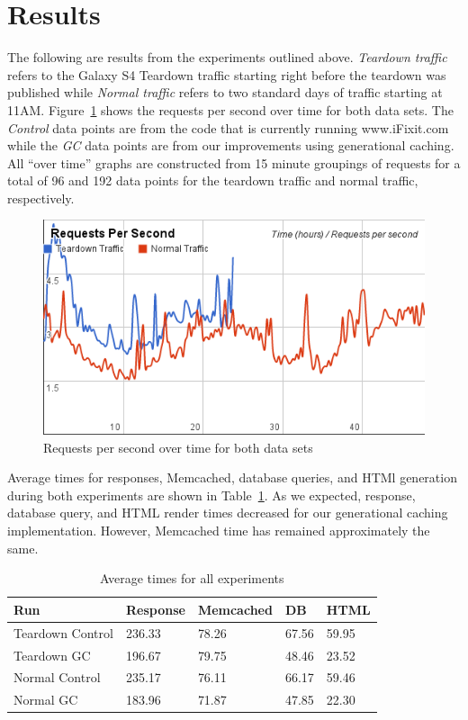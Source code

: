 \documentclass[12pt]{ucthesis}
\begin{document}
\section{Results} \label{results}
The following are results from the experiments outlined above.
\textit{Teardown traffic} refers to the Galaxy S4 Teardown traffic starting right before the teardown was published while \textit{Normal traffic} refers to two standard days of traffic starting at 11AM\@.
Figure~\ref{fig:requestsPerSecXTime} shows the requests per second over time for both data sets.
The \textit{Control} data points are from the code that is currently running \textsf{www.iFixit.com} while the \textit{GC} data points are from our improvements using generational caching.
All ``over time'' graphs are constructed from 15 minute groupings of requests for a total of 96 and 192 data points for the teardown traffic and normal traffic, respectively.

\begin{figure}[h]
\centering
\includegraphics[width=\textwidth]{assets/requestsPerSecXTime.png}
\caption{Requests per second over time for both data sets}
\label{fig:requestsPerSecXTime}
\end{figure}

Average times for responses, \textsf{Memcached}, database queries, and HTMl generation during both experiments are shown in Table~\ref{tab:averageExperimentTimes}.
As we expected, response, database query, and HTML render times decreased for our generational caching implementation.
However, \textsf{Memcached} time has remained approximately the same.

\begin{table}[h]
\begin{center}
\begin{tabular}{| l | l | l | l | l |}
   \hline
   Run & Response & Memcached & DB & HTML \\ \hline
   Teardown Control & 236.33 & 78.26 & 67.56 & 59.95 \\ \hline
   Teardown GC & 196.67 & 79.75 & 48.46 & 23.52 \\ \hline
   \hline
   Normal Control & 235.17 & 76.11 & 66.17 & 59.46 \\ \hline
   Normal GC & 183.96 & 71.87 & 47.85 & 22.30 \\
   \hline
\end{tabular}
\end{center}
\caption{Average times for all experiments}
\label{tab:averageExperimentTimes}
\end{table}
\end{document}
